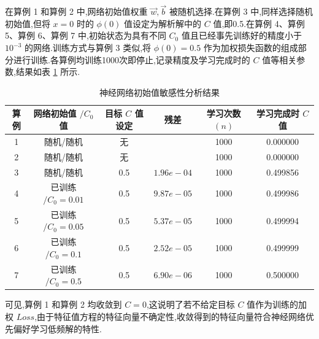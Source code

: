 \documentclass{Sichuan Normal University}
\begin{document}
在算例 1 和算例 2 中,网络初始值权重 ${\vec{w}, \vec{b}}$ 被随机选择.在算例 3 中,同样选择随机初始值,但将 $x=0$ 时的 $\phi(0)$ 值设定为解析解中的 $C$ 值,即0.5.在算例 4、算例 5、算例 6、算例 7 中,初始状态为具有不同 $C_0$ 值且已经事先训练好的精度小于 $10^{-3}$ 的网络.训练方式与算例 3 类似,将 $\phi(0)=0.5$ 作为加权损失函数的组成部分进行训练.各算例均训练1000次即停止,记录精度及学习完成时的 $C$ 值等相关参数,结果如表 \ref{tab:sensitivity_analysis_results} 所示.
\begin{table}[H]
    \caption{神经网络初始值敏感性分析结果}
    \centering
    \begin{tabular}{cccccc}
        \toprule
        \textbf{算例} & \textbf{网络初始值 $/ C_0$ 值} & \textbf{目标 $C$ 值设定} & \textbf{残差} & \textbf{学习次数 $(n)$} & \textbf{学习完成时 $C$ 值} \\
        \midrule
        1 & 随机/随机 & 无 &  & 1000 & 0.000000 \\
        2 & 随机/随机 & 无 &  & 1000 & 0.000000 \\
        3 & 随机/随机 & 0.5 & $1.96e-04$ & 1000 & 0.499856 \\
        4 & 已训练 $/ C_0=0.01$ & 0.5 & $9.87e-05$ & 1000 & 0.499986 \\
        5 & 已训练 $/ C_0=0.05$ & 0.5 & $5.37e-05$ & 1000 & 0.499994 \\
        6 & 已训练 $/ C_0=0.1$ & 0.5 & $2.52e-05$ & 1000 & 0.499999 \\
        7 & 已训练 $/ C_0=0.5$ & 0.5 & $6.90e-06$ & 1000 & 0.500000 \\
        \bottomrule
    \end{tabular}
    \label{tab:sensitivity_analysis_results}
\end{table}
可见,算例 1 和算例 2 均收敛到 $C=0$,这说明了若不给定目标 $C$ 值作为训练的加权 $Loss$,由于特征值方程的特征向量不确定性,收敛得到的特征向量符合神经网络优先偏好学习低频解的特性.
\end{document}
